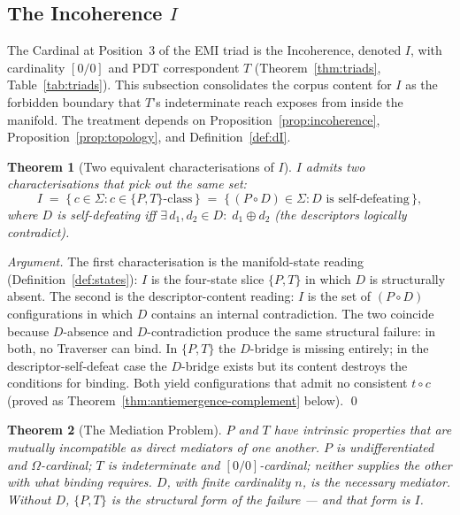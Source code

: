 \documentclass[11pt,a4paper]{article}
\newtheorem{theorem}{Theorem}[section]
\theoremstyle{definition}
\theoremstyle{remark}
\begin{document}
\subsection{The Incoherence $I$}\label{subsec:incoherence}

The Cardinal at Position~3 of the EMI triad is the Incoherence, denoted $I$, with cardinality $[0/0]$ and PDT correspondent $T$ (Theorem~\ref{thm:triads}, Table~\ref{tab:triads}). This subsection consolidates the corpus content for $I$ as the forbidden boundary that $T$'s indeterminate reach exposes from inside the manifold. The treatment depends on Proposition~\ref{prop:incoherence}, Proposition~\ref{prop:topology}, and Definition~\ref{def:dI}.

\begin{theorem}[Two equivalent characterisations of $I$]\label{thm:incoherence-equivalence}
$I$ admits two characterisations that pick out the same set:
\[
I \;=\; \{\,c \in \Sigma : c \in \{P,T\}\text{-class}\,\} \;=\; \{\,(P\circ D) \in \Sigma : D \text{ is self-defeating}\,\},
\]
where $D$ is self-defeating iff $\exists\, d_{1}, d_{2} \in D :\; d_{1} \oplus d_{2}$ (the descriptors logically contradict).
\end{theorem}

\begin{proof}[Argument]
The first characterisation is the manifold-state reading (Definition~\ref{def:states}): $I$ is the four-state slice $\{P, T\}$ in which $D$ is structurally absent. The second is the descriptor-content reading: $I$ is the set of $(P\circ D)$ configurations in which $D$ contains an internal contradiction. The two coincide because $D$-absence and $D$-contradiction produce the same structural failure: in both, no Traverser can bind. In $\{P,T\}$ the $D$-bridge is missing entirely; in the descriptor-self-defeat case the $D$-bridge exists but its content destroys the conditions for binding. Both yield configurations that admit no consistent $t \circ c$ (proved as Theorem~\ref{thm:antiemergence-complement} below). \qed
\end{proof}

\begin{theorem}[The Mediation Problem]\label{thm:mediation-problem}
$P$ and $T$ have intrinsic properties that are mutually incompatible as direct mediators of one another. $P$ is undifferentiated and $\Omega$-cardinal; $T$ is indeterminate and $[0/0]$-cardinal; neither supplies the other with what binding requires. $D$, with finite cardinality $n$, is the necessary mediator. Without $D$, $\{P,T\}$ is the structural form of the failure --- and that form is $I$.
\end{theorem}
\end{document}
